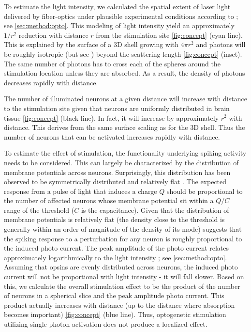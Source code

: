 \documentclass[11pt]{article}
\begin{document}
To estimate the light intensity, we calculated the spatial extent of laser light delivered by fiber-optics under plausible experimental conditions according to \citet{Aravanis2007}; see \cref{sec:method:opto}. 
This modeling of light intensity yield an approximately $ 1/r^2 $ reduction with distance $ r $ from the stimulation site \cref{fig:concept} (cyan line). 
This is explained by the surface of a 3D shell growing with $4\pi r^2$ and photons will be roughly isotropic (but see \citep{thunemann2018does}) beyond the scattering length \cref{fig:concept} (inset). 
The same number of photons has to cross each of the spheres around the stimulation location unless they are absorbed. 
As a result, the density of photons decreases rapidly with distance.

The number of illuminated neurons at a given distance will increase with distance to the stimulation site given that neurons are uniformly distributed in brain tissue \cref{fig:concept} (black line). 
In fact, it will increase by approximately $ r^2 $ with distance. 
This derives from the same surface scaling as for the 3D shell. 
Thus the number of neurons that can be activated increases rapidly with distance.

To estimate the effect of stimulation, the functionality underlying spiking activity needs to be considered. 
This can largely be characterized by the  distribution of membrane potentials across neurons. 
Surprisingly, this distribution has been observed to be symmetrically distributed and relatively flat \citep{pare1998impact,destexhe1999impact,rudolph2006use}. 
The expected response from a pulse of light that induces a charge $Q$ should be proportional to the number of affected neurons whose membrane potential sit within a $Q/C$ range of the threshold ($C$ is the capacitance). 
Given that the distribution of membrane potentials is relatively flat (the density close to the threshold is generally within an order of magnitude of the density of its mode) suggests that the spiking response to a perturbation for any neuron is roughly proportional to the induced photo current. 
The peak amplitude of the photo current relates approximately logarithmically to the light intensity \citep{wang2007high}; see \cref{sec:method:opto}. 
Assuming that opsins are evenly distributed across neurons, the induced photo current will not be proportional with light intensity - it will fall slower. 
Based on this, we calculate the overall stimulation effect to be the product of the number of neurons in a spherical slice and the peak amplitude photo current. 
This product actually increases with distance (up to the distance where absorption becomes important) \cref{fig:concept} (blue line). 
Thus, optogenetic stimulation utilizing single photon activation does not produce a localized effect.
\end{document}
